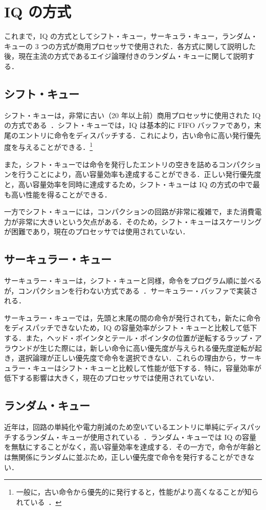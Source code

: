 \section{IQ の方式}
\label{sec:iq_scheme}
これまで，IQ の方式としてシフト・キュー，サーキュラ・キュー，ランダム・キューの 3 つの方式が商用プロセッサで使用された．各方式に関して説明した後，現在主流の方式であるエイジ論理付きのランダム・キューに関して説明する．

\subsection{シフト・キュー}
シフト・キューは，非常に古い（20 年以上前）商用プロセッサに使用された IQ の方式である~\cite{Farrell1998}．シフト・キューでは，IQ は基本的に FIFO バッファであり，末尾のエントリに命令をディスパッチする．これにより，古い命令に高い発行優先度を与えることができる．\footnote{一般に，古い命令から優先的に発行すると，性能がより高くなることが知られている~\cite{Butler1992}．}

また，シフト・キューでは命令を発行したエントリの空きを詰めるコンパクションを行うことにより，高い容量効率も達成することができる．正しい発行優先度と，高い容量効率を同時に達成するため，シフト・キューは IQ の方式の中で最も高い性能を得ることができる．

一方でシフト・キューには，コンパクションの回路が非常に複雑で，また消費電力が非常に大きいという欠点がある．そのため，シフト・キューはスケーリングが困難であり，現在のプロセッサでは使用されていない．

\subsection{サーキュラー・キュー}
サーキュラー・キューは，シフト・キューと同様，命令をプログラム順に並べるが，コンパクションを行わない方式である~\cite{Abella:survey2003}．サーキュラー・バッファで実装される．

サーキュラー・キューでは，先頭と末尾の間の命令が発行されても，新たに命令をディスパッチできないため，IQ の容量効率がシフト・キューと比較して低下する．また，ヘッド・ポインタとテール・ポインタの位置が逆転するラップ・アラウンドが生じた際には，新しい命令に高い優先度が与えられる優先度逆転が起き，選択論理が正しい優先度で命令を選択できない．これらの理由から，サーキュラー・キューはシフト・キューと比較して性能が低下する．特に，容量効率が低下する影響は大きく，現在のプロセッサでは使用されていない．

\subsection{ランダム・キュー}
近年は，回路の単純化や電力削減のため空いているエントリに単純にディスパッチするランダム・キューが使用されている~\cite{Alpha21464, AMD-Bulldozer, IBM-Power8}．ランダム・キューでは IQ の容量を無駄にすることがなく，高い容量効率を達成する．その一方で，命令が年齢とは無関係にランダムに並ぶため，正しい優先度で命令を発行することができない．

